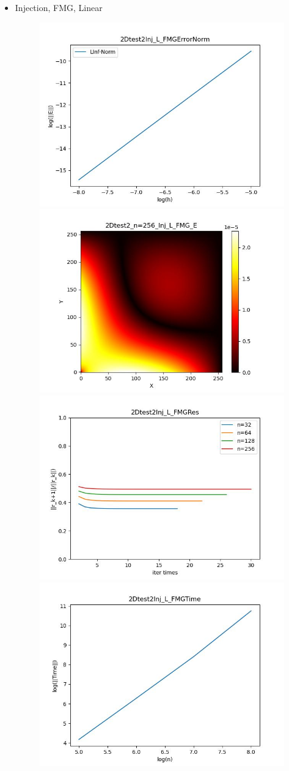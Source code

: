 \documentclass{article}
\begin{document}
\begin{itemize}
    \item Injection, FMG, Linear
    \begin{figure}[h]
        \centering
        \includegraphics[width=0.35\linewidth]{2Dtest2Inj_L_FMGErrorNorm.jpg}
        \includegraphics[width=0.35\linewidth]{2Dtest2_n=256_Inj_L_FMG_E.jpg}
        \includegraphics[width=0.35\linewidth]{2Dtest2Inj_L_FMGRes.jpg}
        \includegraphics[width=0.35\linewidth]{2Dtest2Inj_L_FMGTime.jpg}
    \end{figure}
    

\end{itemize}
\end{document}

